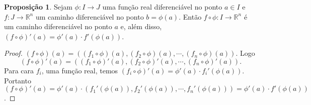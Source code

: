 \documentclass[12pt,leqno,twoside]{amsart}
\theoremstyle{definition}
\newtheorem{proposicao}{Proposição}[section]
\begin{document}
\begin{proposicao}
	Sejam $\phi: I \to J$ uma função real diferenciável no ponto $a\in I$ e $f: J \to \mathbb{R}^n$ um caminho diferenciável no ponto $b = \phi(a)$. Então $f \circ \phi: I \to \mathbb{R}^n$ é um caminho diferenciável no ponto $a$ e, além disso, $(f\circ \phi)'(a) = \phi'(a)\cdot f'(\phi(a))$.
\end{proposicao}
\begin{proof}
	$(f\circ \phi)(a) = ( (f_1\circ\phi)(a), (f_2\circ\phi)(a), \cdots, (f_n \circ \phi)(a)).$ Logo $$(f\circ \phi)'(a) = ( (f_1\circ\phi)'(a), (f_2\circ\phi)'(a), \cdots, (f_n \circ \phi)'(a)) .$$  Para cara $f_i$, uma função real, temos $(f_i\circ \phi)'(a) = \phi'(a) \cdot f_i'(\phi(a))$. Portanto $(f\circ \phi)'(a) = \phi'(a)\cdot ( f_1'(\phi(a)), f_2'(\phi(a)),\cdots, f_n'(\phi(a)) ) = \phi'(a)\cdot f'(\phi(a))$.
\end{proof}
\end{document}
